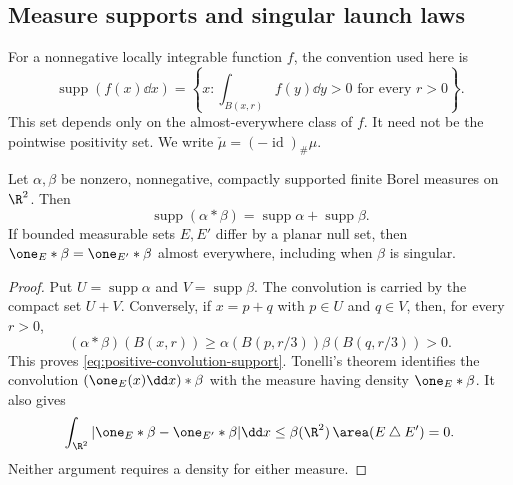 \subsection{Measure supports and singular launch laws}
\label{subsec:measure-support}
For a nonnegative locally integrable function $f$, the convention
used here is
\[
 \operatorname{supp}(f(x)\dd x)
 =\left\{x:\int_{B(x,r)}f(y)\dd y>0
                         \text{ for every }r>0\right\}.
\]
This set depends only on the almost-everywhere class of $f$.
It need not be the pointwise positivity set.  We write
$\check\mu=(-\operatorname{id})_\#\mu$.

\begin{lemma}
\label{lem:positive-convolution-support}
Let $\alpha,\beta$ be nonzero, nonnegative, compactly supported
finite Borel measures on $\R^2$.  Then
\begin{equation}\label{eq:positive-convolution-support}
 \operatorname{supp}(\alpha*\beta)
            =\operatorname{supp}\alpha+\operatorname{supp}\beta.
\end{equation}
If bounded measurable sets $E,E'$ differ by a planar null set,
then $\one_E*\beta=\one_{E'}*\beta$ almost everywhere,
including when $\beta$ is singular.
\end{lemma}
\begin{proof}
Put $U=\operatorname{supp}\alpha$ and
$V=\operatorname{supp}\beta$.  The convolution is carried by the
compact set $U+V$.  Conversely, if $x=p+q$ with $p\in U$ and
$q\in V$, then, for every $r>0$,
\[
 (\alpha*\beta)(B(x,r))
 \ge \alpha(B(p,r/3))\beta(B(q,r/3))>0.
\]
This proves \eqref{eq:positive-convolution-support}.
Tonelli's theorem identifies the convolution
$(\one_E(x)\dd x)*\beta$ with the measure having density
$\one_E*\beta$.  It also gives
\[
 \int_{\R^2}|\one_E*\beta-\one_{E'}*\beta|\dd x
 \le \beta(\R^2)\,\area(E\mathbin\triangle E')=0.
\]
Neither argument requires a density for either measure.
\end{proof}

